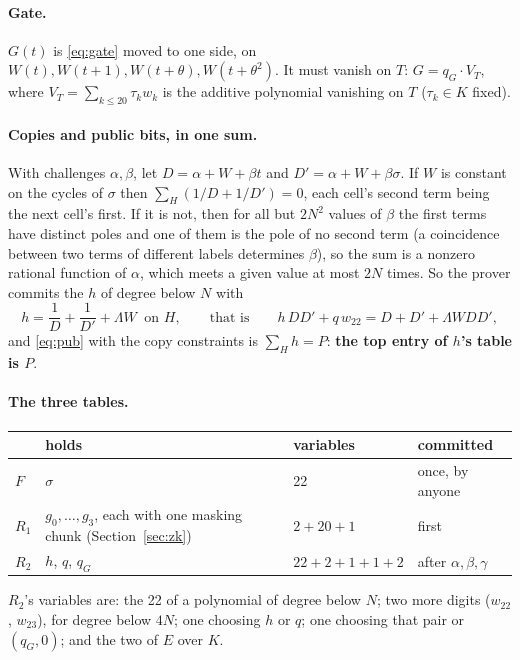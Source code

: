 \documentclass[11pt]{article}
\newcommand{\K}{K}
\newcommand{\E}{E}
\newcommand{\cells}{H}
\newcommand{\reps}{T}
\newcommand{\vT}{V_{\reps}}
\newcommand{\wit}{W}
\newcommand{\perm}{\sigma}
\newcommand{\pub}{\Lambda}
\newcommand{\gate}{G}
\newcommand{\target}{P}
\begin{document}
\paragraph{Gate.} $\gate(t)$ is \eqref{eq:gate} moved to one side, on $\wit(t), \wit(t+1), \wit(t+\theta), \wit(t+\theta^2)$. It must vanish on $\reps$: $\gate = q_\gate \cdot \vT$, where $\vT = \sum_{k \le 20} \tau_k w_k$ is the additive polynomial vanishing on $\reps$ ($\tau_k \in \K$ fixed).

\paragraph{Copies and public bits, in one sum.} With challenges $\alpha, \beta$, let $D = \alpha + \wit + \beta t$ and $D' = \alpha + \wit + \beta \perm$. If $\wit$ is constant on the cycles of $\perm$ then $\sum_{\cells} (1/D + 1/D') = 0$, each cell's second term being the next cell's first. If it is not, then for all but $2 N^2$ values of $\beta$ the first terms have distinct poles and one of them is the pole of no second term (a coincidence between two terms of different labels determines $\beta$), so the sum is a nonzero rational function of $\alpha$, which meets a given value at most $2N$ times. So the prover commits the $h$ of degree below $N$ with
\begin{equation}\label{eq:h}
  h = \frac1D + \frac1{D'} + \pub \wit \ \text{ on } \cells, \qquad\text{that is}\qquad h \, D D' + q \, w_{22} = D + D' + \pub \wit D D' ,
\end{equation}
and \eqref{eq:pub} with the copy constraints is $\sum_{\cells} h = \target$: \textbf{the top entry of $h$'s table is $\target$}.

\paragraph{The three tables.}
\begin{center}
\begin{tabular}{@{}llll@{}}
\toprule
 & holds & variables & committed \\
\midrule
$F$ & $\perm$ & 22 & once, by anyone \\
$R_1$ & $g_0, \dots, g_3$, each with one masking chunk (Section~\ref{sec:zk}) & $2 + 20 + 1$ & first \\
$R_2$ & $h$, $q$, $q_\gate$ & $22 + 2 + 1 + 1 + 2$ & after $\alpha, \beta, \gamma$ \\
\bottomrule
\end{tabular}
\end{center}
$R_2$'s variables are: the 22 of a polynomial of degree below $N$; two more digits ($w_{22}$, $w_{23}$), for degree below $4N$; one choosing $h$ or $q$; one choosing that pair or $(q_\gate, 0)$; and the two of $\E$ over $\K$.
\end{document}
